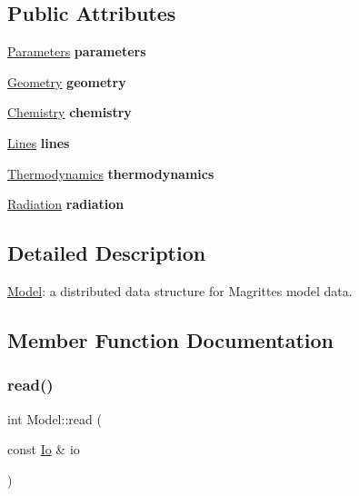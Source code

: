 \subsection*{Public Attributes}
\begin{DoxyCompactItemize}
\item 
\mbox{\label{structModel_a648f41608b8f8a859e1b00ddf4640414}} 
\mbox{\hyperlink{classParameters}{Parameters}} {\bfseries parameters}
\item 
\mbox{\label{structModel_a9eac0359f751ae78cbfe52497465f91d}} 
\mbox{\hyperlink{structGeometry}{Geometry}} {\bfseries geometry}
\item 
\mbox{\label{structModel_ab371cdf43cb5dc99c968daaf4a492a7a}} 
\mbox{\hyperlink{structChemistry}{Chemistry}} {\bfseries chemistry}
\item 
\mbox{\label{structModel_ac5a521af88897ede48b542c798137580}} 
\mbox{\hyperlink{structLines}{Lines}} {\bfseries lines}
\item 
\mbox{\label{structModel_a534b5df30d90b66521e0bf7c1a517447}} 
\mbox{\hyperlink{structThermodynamics}{Thermodynamics}} {\bfseries thermodynamics}
\item 
\mbox{\label{structModel_a1a6983c58adaf88fab7cdfbd5a8ecd71}} 
\mbox{\hyperlink{structRadiation}{Radiation}} {\bfseries radiation}
\end{DoxyCompactItemize}


\subsection{Detailed Description}
\mbox{\hyperlink{structModel}{Model}}\+: a distributed data structure for Magritte\textquotesingle{}s model data. 

\subsection{Member Function Documentation}
\mbox{\label{structModel_a890018e455118fa3e77def90f280dc52}} 
\subsubsection{\texorpdfstring{read()}{read()}}
{\footnotesize\ttfamily int Model\+::read (\begin{DoxyParamCaption}\item[{const \mbox{\hyperlink{structIo}{Io}} \&}]{io }\end{DoxyParamCaption})}

